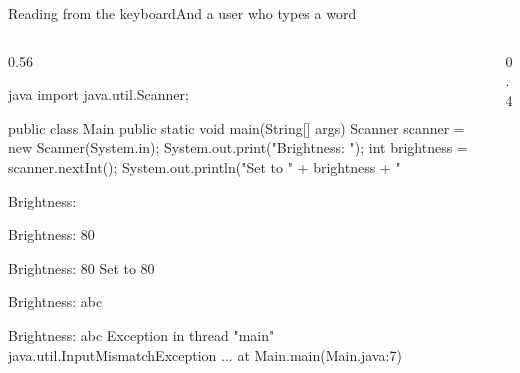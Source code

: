\documentclass[\deckoptions]{beamer}
\begin{document}
\begin{frame}[fragile]{Reading from the keyboard}{And a user who types a word}
  \begin{columns}[c, onlytextwidth]
    \begin{column}{0.56\textwidth}
\begin{codeblock}[steps={1,5|6|7|8|6|7|7|}, dense, marks={1+5/1, 7/3, 7/7/error}]{java}
import java.util.Scanner;

public class Main {
    public static void main(String[] args) {
        Scanner scanner = new Scanner(System.in);
        System.out.print("Brightness: ");
        int brightness = scanner.nextInt();
        System.out.println("Set to " + brightness + "%
    }
}
\end{codeblock}
      \blockgap
      \begin{overprint}
\begin{console}[dense]
Brightness:
\end{console}
\begin{console}[dense]
Brightness: 80
\end{console}
\begin{console}[dense]
Brightness: 80
Set to 80%
\end{console}
\begin{console}[dense]
Brightness: abc
\end{console}
\begin{consoleerror}[dense]
Brightness: abc
Exception in thread "main" java.util.InputMismatchException
    ...
    at Main.main(Main.java:7)
\end{consoleerror}
      \end{overprint}
    \end{column}
    \begin{column}{0.4\textwidth}
      \begin{codenotes}[1]
\end{codenotes}
\end{column}
\end{columns}
\end{frame}
\end{document}

